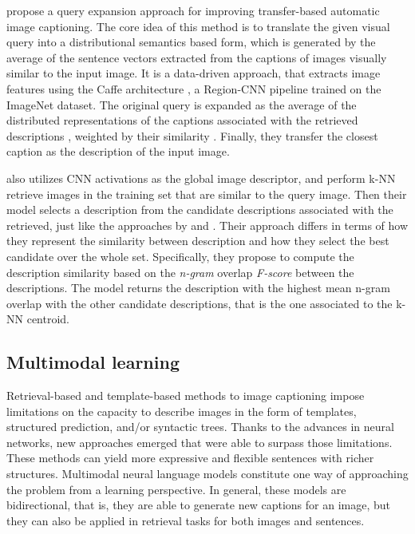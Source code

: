 \citet{Yagcioglu2015} propose a query expansion approach for improving transfer-based automatic image captioning. The core idea of this method is to translate the given visual query into a distributional semantics based form, which is generated by the average of the sentence vectors extracted from the captions of images visually similar to the input image. It is a data-driven approach, that extracts image features using the Caffe architecture \citep{Jia2014}, a Region-CNN pipeline trained on the ImageNet dataset. The original query is expanded as the average of the distributed representations of the captions associated with the retrieved descriptions \citep{Mikolov2013}, weighted by their similarity . Finally, they transfer the closest caption as the description of the input image.

\citet{Devlin2015} also utilizes CNN activations as the global image descriptor, and perform k-NN retrieve images in the training set that are similar to the query image. Then their model selects a description from the candidate descriptions associated with the retrieved, just like the approaches by \citet{Mason2015} and \citet{Yagcioglu2015}. Their approach differs in terms of how they represent the similarity between description and how they select the best candidate over the whole set. Specifically, they propose to compute the description similarity based on the \textit{n-gram} overlap \textit{F-score} between the descriptions. The model returns the description with the highest mean n-gram overlap with the other candidate descriptions, that is the one associated to the k-NN centroid.

\subsection{Multimodal learning}\label{sec:multimodal-learning}

Retrieval-based and template-based methods to image captioning impose limitations on the capacity to describe images in the form of templates, structured prediction, and/or syntactic trees. Thanks to the advances in neural networks, new approaches emerged that were able to surpass those limitations. These methods can yield more expressive and flexible sentences with richer structures.  Multimodal neural language models constitute one way of approaching the problem from a learning perspective. In general, these models are bidirectional, that is, they are able to generate new captions for an image, but they can also be applied in retrieval tasks for both images and sentences.

